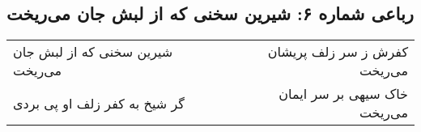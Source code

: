 \begin{center}
\section*{رباعی شماره ۶: شیرین سخنی که از لبش جان می‌ریخت}
\label{sec:006}
\begin{longtable}{l p{0.5cm} r}
شیرین سخنی که از لبش جان می‌ریخت
&&
کفرش ز سر زلف پریشان می‌ریخت
\\
گر شیخ به کفر زلف او پی بردی
&&
خاک سیهی بر سر ایمان می‌ریخت
\\
\end{longtable}
\end{center}
